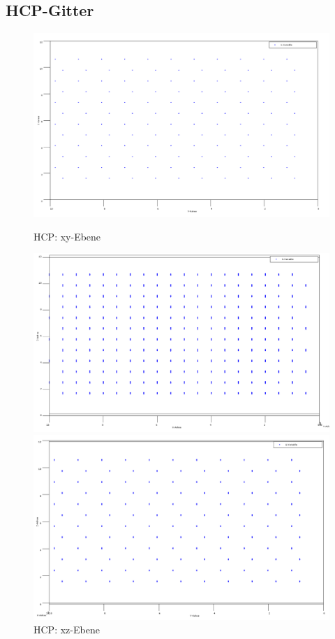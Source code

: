 \subsection{HCP-Gitter}

\begin{figure}[H]
\begin{minipage}[b]{0.3\textwidth}
    \centering
    \includegraphics[scale=0.12]{data/hcp_x-y.PNG}
    \caption{HCP: xy-Ebene}
    \label{fig:hcpxy}
\end{minipage}    
\begin{minipage}[b]{0.3\textwidth}
    \centering
    \includegraphics[scale=0.12]{data/hcp_z-x.PNG}
    \caption{HCP: xz-Ebene}
    \label{fig:hcpxz}
\end{minipage} 
\begin{minipage}[b]{0.3\textwidth}
    \centering
    \includegraphics[scale=0.12]{data/hcp_z-y.PNG}

\end{minipage}
\end{figure}
